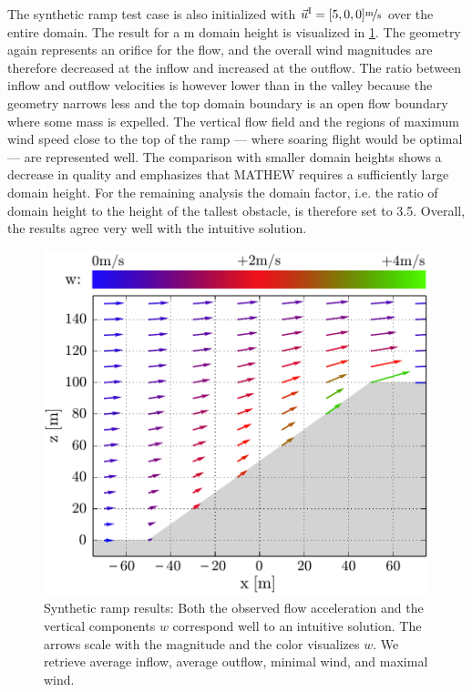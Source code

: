 \documentclass[twocolumn,letterpaper]{IEEEAerospaceCLS}
\begin{document}
The synthetic ramp test case is also initialized with $\vec{u}^\text{I}=[5,0,0]\unitfrac[]{m}{s}$ over the entire domain. The result for a \unit[600]{m} domain height is visualized in \cref{fig:PL_WindPred_ramp_example}. The geometry again represents an orifice for the flow, and the overall wind magnitudes are therefore decreased at the inflow and increased at the outflow. The ratio between inflow and outflow velocities is however lower than in the valley because the geometry narrows less and the top domain boundary is an open flow boundary where some mass is expelled. The vertical flow field and the regions of maximum wind speed close to the top of the ramp --- where soaring flight would be optimal --- are represented well. The comparison with smaller domain heights shows a decrease in quality and emphasizes that MATHEW requires a sufficiently large domain height. For the remaining analysis the domain factor, i.e. the ratio of domain height to the height of the tallest obstacle, is therefore set to 3.5. Overall, the results agree very well with the intuitive solution.

\begin{figure}[htbp]
\centering
\includegraphics[width=\columnwidth]{images/WindPred/Results/u_pred_ramp_df06_00.pdf}
\caption[Results for the synthetic ramp test case]{Synthetic ramp results: Both the observed flow acceleration and the vertical components $w$ correspond well to an intuitive solution. The arrows scale with the magnitude and the color visualizes $w$. We retrieve {} average inflow, {} average outflow, {} minimal wind, and {} maximal wind.}
\label{fig:PL_WindPred_ramp_example}
\end{figure}
\end{document}
